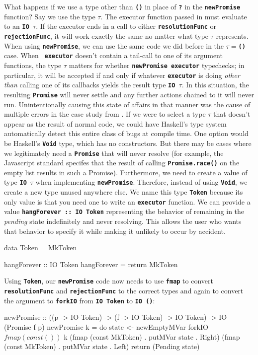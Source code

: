 \documentclass[12pt, english, letterpaper]{kuthesis}
\newcommand{\lit}[1]{\textbf{\texttt{#1}}}
\begin{document}
What happens if we use a type other than \lit{()} in place of \lit ? in the \lit{newPromise} function?  Say we use the type $\tau$.  The executor function passed in must evaluate to an \lit{IO $\tau$}.  If the executor ends in a call to either \lit{resolutionFunc} or \lit{rejectionFunc}, it will work exactly the same no matter what type $\tau$ represents.  When using \lit{newPromise}, we can use the same code we did before in the \lit{$\tau = $()} case.  When \lit{ executor} doesn't contain a tail-call to one of its argument functions, the type $\tau$ matters for whether \lit{newPromise executor} typechecks; in particular, it will be accepted if and only if whatever \lit{executor} is doing \emph{other than} calling one of its callbacks yields the result type \lit{IO $\tau$}. In this situation, the resulting \lit{Promise} will never settle and any further actions chained to it will never run.  Unintentionally causing this state of affairs in that manner was the cause of multiple errors in the case study from \cite{madsen}. If we were to select a type $\tau$ that doesn't appear as the result of normal code, we could have Haskell's type system automatically detect this entire class of bugs at compile time.  One option would be Haskell's \lit{Void} type, which has no constructors.  But there may be cases where we legitimately need a \lit{Promise} that will never resolve (for example, the Javascript standard specifes that the result of calling \lit{Promise.race()} on the empty list results in such a \textsf{Promise}).  Furthermore, we need to create a value of type \lit{IO $\tau$} when implementing \lit{newPromise}.  Therefore, instead of using \lit{Void}, we create a new type unused anywhere else.  We name this type \lit{Token} because its only value is that you need one to write an \lit{executor} function.
We can provide a value \lit{hangForever ::\ IO Token} representing the behavior of remaining in the \emph{pending} state indefinitely and never resolving.  This allows the user who wants that behavior to specify it while making it unlikely to occur by accident.
\begin{code}
data Token = MkToken

hangForever :: IO Token
hangForever = return MkToken
\end{code}
Using \lit{Token}, our \lit{newPromise} code now needs to use \lit{fmap} to convert \lit{resolutionFunc} and \lit{rejectionFunc} to the correct types and again to convert the argument to \lit{forkIO} from \lit{IO Token} to \lit{IO ()}:
\begin{code}
newPromise :: ((p -> IO Token) -> (f -> IO Token) -> IO Token)
              -> IO (Promise f p)
newPromise k = do
  state <- newEmptyMVar
  forkIO $ fmap (const ()) $ k (fmap (const MkToken)
                                     . putMVar state . Right)
                               (fmap (const MkToken)
                                     . putMVar state . Left)
  return (Pending state)
\end{code}
\end{document}
